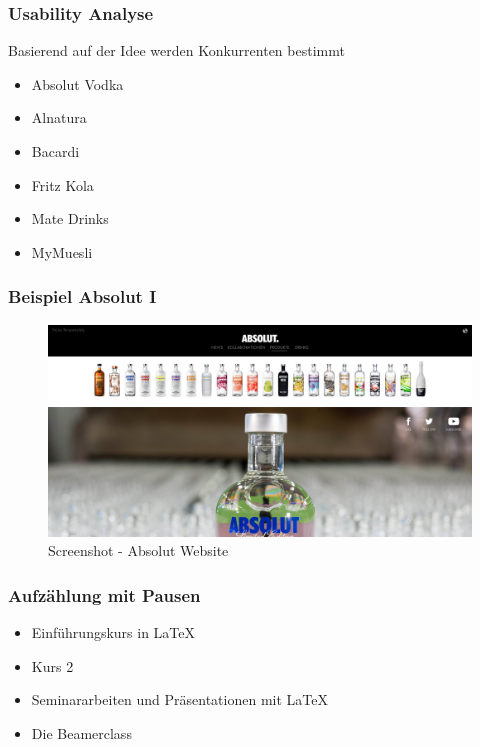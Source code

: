\begin{frame}\frametitle{Usability Analyse}
Basierend auf der Idee werden Konkurrenten bestimmt
\begin{itemize}
\item Absolut Vodka
\item Alnatura
\item Bacardi
\item Fritz Kola
\item Mate Drinks
\item MyMuesli
\end{itemize}
\end{frame}

\begin{frame}\frametitle{Beispiel Absolut I}
\begin{figure}
\includegraphics[scale=0.2]{absolut}
\caption[Screenshot - Absolut Vodka]{Screenshot - Absolut Website}
\label{labelname}
\end{figure}
\end{frame}









\begin{frame}\frametitle{Aufz\"ahlung mit Pausen}
\begin{itemize}
\item  Einf\"uhrungskurs in \LaTeX \pause 
\item  Kurs 2 \pause 
\item  Seminararbeiten und Pr\"asentationen mit \LaTeX \pause 
\item  Die Beamerclass
\end{itemize} 
\end{frame}

